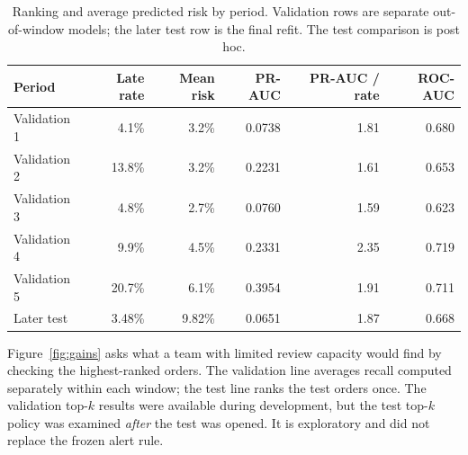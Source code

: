 \documentclass[11pt,a4paper]{article}
\begin{document}
\begin{table}[h]
\centering\small
\caption{Ranking and average predicted risk by period. Validation rows are separate out-of-window models; the later test row is the final refit. The test comparison is post hoc.}
\label{tab:periods}
\begin{tabular}{@{}lrrrrr@{}}
\toprule
Period & Late rate & Mean risk & PR-AUC & PR-AUC / rate & ROC-AUC \\
\midrule
Validation 1 & 4.1\% & 3.2\% & 0.0738 & 1.81 & 0.680 \\
Validation 2 & 13.8\% & 3.2\% & 0.2231 & 1.61 & 0.653 \\
Validation 3 & 4.8\% & 2.7\% & 0.0760 & 1.59 & 0.623 \\
Validation 4 & 9.9\% & 4.5\% & 0.2331 & 2.35 & 0.719 \\
Validation 5 & 20.7\% & 6.1\% & 0.3954 & 1.91 & 0.711 \\
Later test & 3.48\% & 9.82\% & 0.0651 & 1.87 & 0.668 \\
\bottomrule
\end{tabular}
\end{table}

Figure~\ref{fig:gains} asks what a team with limited review capacity would find by checking the highest-ranked orders. The validation line averages recall computed separately within each window; the test line ranks the test orders once. The validation top-$k$ results were available during development, but the test top-$k$ policy was examined \emph{after} the test was opened. It is exploratory and did not replace the frozen alert rule.
\end{document}
